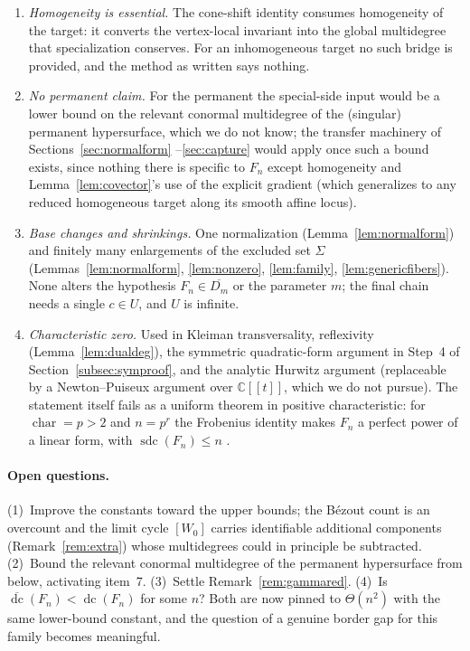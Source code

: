 \documentclass[acmsmall,screen,nonacm]{acmart}
\theoremstyle{definition}
\theoremstyle{remark}
\DeclareMathOperator{\dc}{dc}
\DeclareMathOperator{\sdc}{sdc}
\newcommand{\CC}{\mathbb{C}}
\newcommand{\dcb}{\overline{\dc}}
\begin{document}
\begin{enumerate}[leftmargin=2em]
classes: Lemma~\ref{lem:positivity}.  Curve selection:
Lemma~\ref{lem:normalform}.  Smoothness of the open graph over the
curve (Jacobian criterion) and reducedness of the generic fibre
cycles: Lemmas~\ref{lem:smoothgraph} and~\ref{lem:genericfibers}.
Torsion-freeness over a DVR and flat-fibre dimension theory:
Lemmas~\ref{lem:family} and~\ref{lem:genericfibers}.  Specialization
of cycle classes: Lemma~\ref{lem:conservation}.  Hurwitz:
Lemma~\ref{lem:hurwitz}.
\item \emph{Homogeneity is essential.}  The cone-shift identity
consumes homogeneity of the target: it converts the vertex-local
invariant into the global multidegree that specialization conserves.
For an inhomogeneous target no such bridge is provided, and the method
as written says nothing.
\item \emph{No permanent claim.}  For the permanent the special-side
input would be a lower bound on the relevant conormal multidegree of
the (singular) permanent hypersurface, which we do not know; the
transfer machinery of Sections~\ref{sec:normalform}
--\ref{sec:capture} would apply once such a bound exists, since
nothing there is specific to $F_n$ except homogeneity and
Lemma~\ref{lem:covector}'s use of the explicit gradient (which
generalizes to any reduced homogeneous target along its smooth affine
locus).
\item \emph{Base changes and shrinkings.}  One normalization
(Lemma~\ref{lem:normalform}) and finitely many enlargements of the
excluded set $\Sigma$ (Lemmas~\ref{lem:normalform},
\ref{lem:nonzero}, \ref{lem:family}, \ref{lem:genericfibers}).  None
alters the hypothesis $F_n\in\overline{D_m}$ or the parameter $m$; the
final chain needs a single $c\in U$, and $U$ is infinite.
\item \emph{Characteristic zero.}  Used in Kleiman transversality,
reflexivity (Lemma~\ref{lem:dualdeg}), the symmetric quadratic-form
argument in Step~4 of Section~\ref{subsec:symproof}, and the analytic
Hurwitz argument (replaceable by a Newton--Puiseux argument over
$\CC[[t]]$, which we do not pursue).  The statement itself fails as a
uniform theorem in positive characteristic: for
$\operatorname{char}=p>2$ and $n=p^r$ the Frobenius identity makes
$F_n$ a perfect power of a linear form, with $\sdc(F_n)\le n$
\cite[Rem.~6.1]{SheshadriSDC}.
\end{enumerate}

\paragraph{Open questions.}
(1)~Improve the constants toward the upper bounds; the B\'ezout count
is an overcount and the limit cycle $[W_0]$ carries identifiable additional components
(Remark~\ref{rem:extra}) whose multidegrees could in principle be
subtracted.  (2)~Bound the relevant conormal multidegree of the
permanent hypersurface from below, activating item~7.
(3)~Settle Remark~\ref{rem:gammared}.  (4)~Is $\dcb(F_n)<\dc(F_n)$
for some $n$?  Both are now pinned to $\Theta(n^2)$ with the same
lower-bound constant, and the question of a genuine border gap for
this family becomes meaningful.
\end{document}
